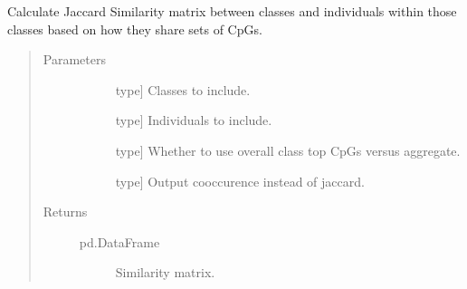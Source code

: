 \documentclass[letterpaper,10pt,english]{sphinxmanual}
\begin{document}
\begin{fulllineitems}
\begin{fulllineitems}
\begin{quote}
\begin{description}
\end{description}\end{quote}

\end{fulllineitems}


\begin{fulllineitems}
\label{\detokenize{index:methylnet.interpretation_classes.ShapleyDataExplorer.jaccard_similarity_top_cpgs}}
Calculate Jaccard Similarity matrix between classes and individuals within those classes based on how they share sets of CpGs.
\begin{quote}\begin{description}
\item[{Parameters}] \leavevmode\begin{description}
\item[{}] \leavevmode{[}type{]}
Classes to include.

\item[{}] \leavevmode{[}type{]}
Individuals to include.

\item[{}] \leavevmode{[}type{]}
Whether to use overall class top CpGs versus aggregate.

\item[{}] \leavevmode{[}type{]}
Output cooccurence instead of jaccard.

\end{description}

\item[{Returns}] \leavevmode\begin{description}
\item[{pd.DataFrame}] \leavevmode
Similarity matrix.

\end{description}

\end{description}\end{quote}

\end{fulllineitems}


\end{fulllineitems}
\end{document}
